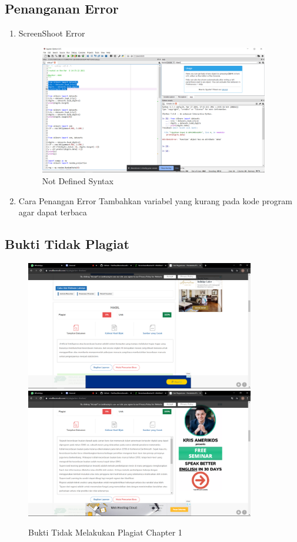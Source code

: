 	\subsection{Penanganan Error}
\begin{enumerate}
	\item ScreenShoot Error
	\begin{figure}[h]
		\includegraphics[width=10cm]{figures/1184049/EROR1.png}
		\centering
		\caption{Not Defined Syntax}
	\end{figure}
	\item Cara Penangan Error
\hfill\break Tambahkan variabel yang kurang pada kode program agar dapat terbaca
	\end{enumerate}
	\subsection{Bukti Tidak Plagiat}
\begin{figure}[h]
	\includegraphics[width=10cm]{figures/1184049/PL1.png}
	\includegraphics[width=10cm]{figures/1184049/PL2.png}
	\centering
	\caption{Bukti Tidak Melakukan Plagiat Chapter 1}
\end{figure}